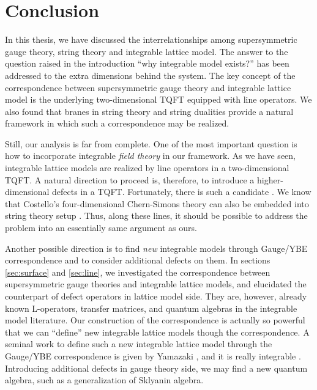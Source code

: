 \begin{comment}
\documentclass[11pt]{article}  %
\usepackage{Common/toshi}

\end{comment}



\section{Conclusion}
\label{sec:discussion}

In this thesis, we have discussed the interrelationships
among supersymmetric gauge theory, string theory and integrable
lattice model. The answer to the question raised in
the introduction ``why integrable model exists?'' has been addressed to
the extra dimensions behind the system.
The key concept of the correspondence between supersymmetric gauge theory
and integrable lattice model is the underlying two-dimensional TQFT equipped
with line operators.
We also found that branes in string theory and string dualities
provide a natural framework in which such a
correspondence may be realized.


Still, our analysis is far from complete.
One of the most important question is how to incorporate integrable
\emph{field theory} in our framework.
As we have seen, integrable lattice models %
are realized by line operators in a two-dimensional TQFT.
A natural direction to proceed is, therefore, to
introduce a higher-dimensional defects in a TQFT.
Fortunately, there is such a candidate \cite{Costello:2019tri}.
We know that Costello's four-dimensional Chern-Simons theory can also
be embedded into string theory setup \cite{Costello:2018txb}.
Thus, along these lines, it should be possible to address the problem
into an essentially same argument as ours.


Another possible direction is to find \emph{new} integrable
models through Gauge/YBE correspondence and to consider additional defects on them.
In sections \ref{sec:surface} and \ref{sec:line}, we investigated
the correspondence between supersymmetric gauge theories and integrable
lattice models, and elucidated the counterpart of defect operators in
lattice model side.
They are, however, already known L-operators, transfer matrices, and
quantum algebras in the integrable model literature.
Our construction of the correspondence is actually so powerful that
we can ``define'' new integrable lattice models though the correspondence.
A seminal work to define such a new integrable lattice model through the
Gauge/YBE correspondence is given by Yamazaki \cite{Yamazaki:2013nra}, and
it is really integrable \cite{Kels:2015bda,Kels:2017toi,Kels:2017vbc}.
Introducing additional defects in gauge theory side, we may find a
new quantum algebra, such as a generalization of Sklyanin algebra.


